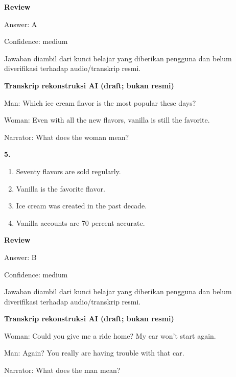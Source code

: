 \documentclass[12pt]{article}
\begin{document}
\begingroup
\setlength{\parskip}{0pt}
\setlength{\parindent}{0pt}
\textbf{Review}\par
Answer: A\par
Confidence: medium\par
Jawaban diambil dari kunci belajar yang diberikan pengguna dan belum diverifikasi terhadap audio/transkrip resmi.\par
\endgroup
\par
\vspace{0.25\baselineskip}
\begin{exampleblock}
\textbf{Transkrip rekonstruksi AI (draft; bukan resmi)}\par
Man: Which ice cream flavor is the most popular these days?\par
Woman: Even with all the new flavors, vanilla is still the favorite.\par
Narrator: What does the woman mean?\par
\end{exampleblock}
\noindent\textbf{5.}
\begin{enumerate}[label=(\Alph*),leftmargin=*,itemsep=0.2em]
\item Seventy flavors are sold regularly.
\item Vanilla is the favorite flavor.
\item Ice cream was created in the past decade.
\item Vanilla accounts are 70 percent accurate.
\end{enumerate}
\par
\begingroup
\setlength{\parskip}{0pt}
\setlength{\parindent}{0pt}
\textbf{Review}\par
Answer: B\par
Confidence: medium\par
Jawaban diambil dari kunci belajar yang diberikan pengguna dan belum diverifikasi terhadap audio/transkrip resmi.\par
\endgroup
\par
\vspace{0.25\baselineskip}
\begin{exampleblock}
\textbf{Transkrip rekonstruksi AI (draft; bukan resmi)}\par
Woman: Could you give me a ride home? My car won't start again.\par
Man: Again? You really are having trouble with that car.\par
Narrator: What does the man mean?\par
\end{exampleblock}
\end{document}

